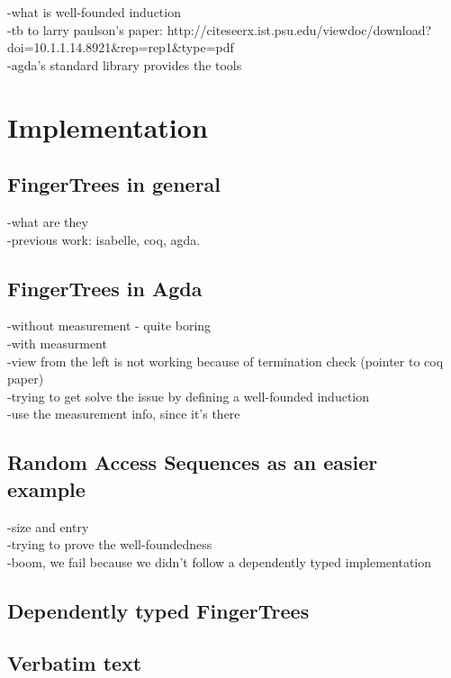 \documentclass[12pt,twoside,notitlepage]{report}
\begin{document}
-what is well-founded induction \\
-tb to larry paulson's paper: http://citeseerx.ist.psu.edu/viewdoc/download?doi=10.1.1.14.8921&rep=rep1&type=pdf \\
-agda's standard library provides the tools \\

\chapter{Implementation}

\section{FingerTrees in general}

-what are they \\
-previous work: isabelle, coq, agda. \\

\section{FingerTrees in Agda}

-without measurement - quite boring \\
-with measurment \\
-view from the left is not working because of termination check (pointer to coq paper) \\
-trying to get solve the issue by defining a well-founded induction \\
-use the measurement info, since it's there \\

\section{Random Access Sequences as an easier example}

-size and entry \\
-trying to prove the well-foundedness \\
-boom, we fail because we didn't follow a dependently typed implementation \\

\section{Dependently typed FingerTrees}



\section{Verbatim text}
\end{document}
